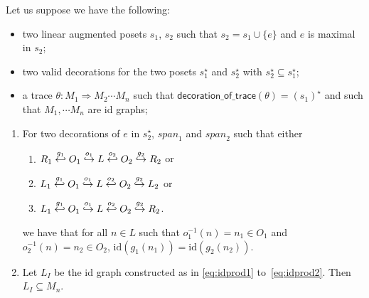 \begin{lemma}
  \label{lem:correction}
  Let us suppose we have the following:
  \begin{itemize}
  \item two linear augmented posets $s_1$, $s_2$ such that $s_2=s_1\cup\{e\}$ and $e$ is maximal in $s_2$;
  \item two valid decorations for the two posets $s_1^{\star}$ and $s_2^{\star}$ with $s_2^{\star}\subseteq s_1^{\star}$;
  \item a trace $\theta:M_1\Rightarrow M_2\cdots M_n$ such that $\mathsf{decoration\_of\_trace}(\theta)=(s_1)^{\star}$ and such that $M_1,\cdots M_n$ are id graphs;
  \end{itemize}
  \begin{enumerate}
  \item For two decorations of $e$ in $s_2^{\star}$, $\mathit{span}_1$ and $\mathit{span}_2$ such that either
    \begin{enumerate}
    \item
      $R_1 \overset{g_1}{\hookleftarrow} O_1 \overset{o_1}{\hookrightarrow} L \overset{o_2}{\hookleftarrow} O_2\overset{g_2}{\hookrightarrow} R_2$ or
    \item $L_1 \overset{g_1}{\hookleftarrow} O_1 \overset{o_1}{\hookrightarrow} L \overset{o_2}{\hookleftarrow} O_2\overset{g_2}{\hookrightarrow} L_2$ or
    \item $L_1 \overset{g_1}{\hookleftarrow} O_1 \overset{o_1}{\hookrightarrow} L \overset{o_2}{\hookleftarrow} O_2\overset{g_2}{\hookrightarrow} R_2$.
    \end{enumerate}
    we have that for all $n\in L$ such that $o_1^{-1}(n) = n_1\in O_1$ and $o_2^{-1}(n) = n_2\in O_2$, $\text{id}(g_1(n_1)) = \text{id}(g_2(n_2))$.
  \item
  \label{lem:correction_2}
  Let $L_I$ be the id graph constructed as in \autoref{eq:idprod1} to~\autoref{eq:idprod2}. Then $L_I\subseteq M_n$.
\end{enumerate}
\end{lemma}
